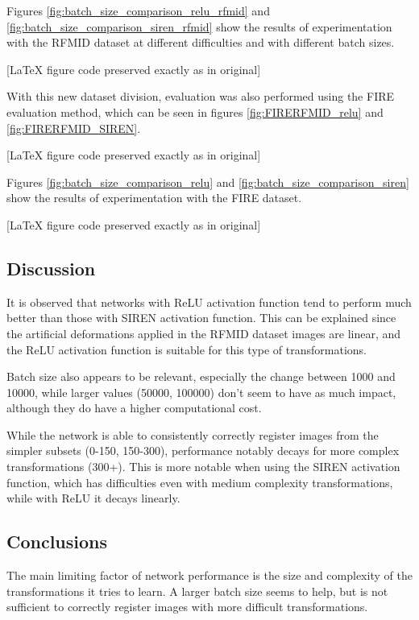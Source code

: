 Figures \ref{fig:batch_size_comparison_relu_rfmid} and \ref{fig:batch_size_comparison_siren_rfmid} show the results of experimentation with the RFMID dataset at different difficulties and with different batch sizes.

[LaTeX figure code preserved exactly as in original]

With this new dataset division, evaluation was also performed using the FIRE evaluation method, which can be seen in figures \ref{fig:FIRERFMID_relu} and \ref{fig:FIRERFMID_SIREN}.

[LaTeX figure code preserved exactly as in original]

Figures \ref{fig:batch_size_comparison_relu} and \ref{fig:batch_size_comparison_siren} show the results of experimentation with the FIRE dataset.

[LaTeX figure code preserved exactly as in original]

\subsection{Discussion}
\label{subsec:Discusion-batchsize}

It is observed that networks with ReLU activation function tend to perform much better than those with SIREN activation function. This can be explained since the artificial deformations applied in the RFMID dataset images are linear, and the ReLU activation function is suitable for this type of transformations.

Batch size also appears to be relevant, especially the change between 1000 and 10000, while larger values (50000, 100000) don't seem to have as much impact, although they do have a higher computational cost.

While the network is able to consistently correctly register images from the simpler subsets (0-150, 150-300), performance notably decays for more complex transformations (300+).
This is more notable when using the SIREN activation function, which has difficulties even with medium complexity transformations, while with ReLU it decays linearly.

\subsection{Conclusions}\label{subsec:Conclusions-batchsize}

The main limiting factor of network performance is the size and complexity of the transformations it tries to learn.
A larger batch size seems to help, but is not sufficient to correctly register images with more difficult transformations.


